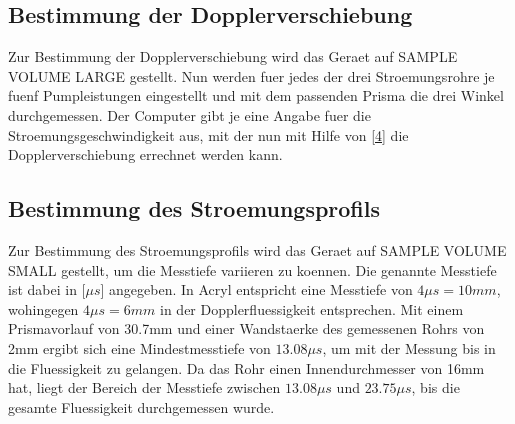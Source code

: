 \documentclass[titlepage=firstcover, captions=tableheading]{scrartcl}
\begin{document}
\subsection{Bestimmung der Dopplerverschiebung}
Zur Bestimmung der Dopplerverschiebung wird das Geraet auf SAMPLE VOLUME LARGE gestellt. Nun werden fuer jedes der drei Stroemungsrohre je fuenf Pumpleistungen eingestellt und mit dem passenden Prisma die drei Winkel durchgemessen. Der Computer gibt je eine Angabe fuer die Stroemungsgeschwindigkeit aus, mit der nun mit Hilfe von \ref{4} die Dopplerverschiebung errechnet werden kann.
\subsection{Bestimmung des Stroemungsprofils}
Zur Bestimmung des Stroemungsprofils wird das Geraet auf SAMPLE VOLUME SMALL gestellt, um die Messtiefe variieren zu koennen. Die genannte Messtiefe ist dabei in [$\mu s$] angegeben. In Acryl entspricht eine Messtiefe von $4\mu s=10mm$, wohingegen $4\mu s=6mm$ in der Dopplerfluessigkeit entsprechen. Mit einem Prismavorlauf von 30.7mm und einer Wandstaerke des gemessenen Rohrs von 2mm ergibt sich eine Mindestmesstiefe von $13.08\mu s$, um mit der Messung bis in die Fluessigkeit zu gelangen. Da das Rohr einen Innendurchmesser von 16mm hat, liegt der Bereich der Messtiefe zwischen $13.08\mu s$ und $23.75\mu s$, bis die gesamte Fluessigkeit durchgemessen wurde.
\end{document}
